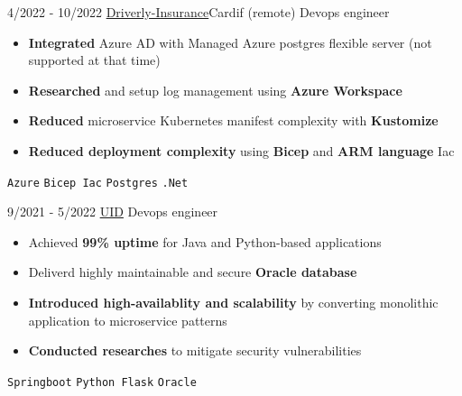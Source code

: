 \documentclass[9pt]{developercv} %
\begin{document}
\begin{center}
    \hdashrule[0.2ex]{\linewidth}{0.5pt}{.8mm}
\end{center}
\vspace{5pt}
\begin{entrylist}
    \entry
    {4/2022 - 10/2022}
    {\href{https://driverly.co.uk}{Driverly-Insurance}\newline\small\textnormal{Cardif (remote)}}
    {Devops engineer}
    {\vspace{-6pt}
    \begin{itemize}[itemsep=2pt,topsep=0pt,parsep=0pt,partopsep=0pt, leftmargin=-1pt]
        \item{\textbf{Integrated} Azure AD with Managed Azure postgres flexible server (not supported at that time)}
        \item{\textbf{Researched} and setup log management using \textbf{Azure Workspace}}
        \item{\textbf{Reduced} microservice Kubernetes manifest complexity with \textbf{Kustomize}}
        \item{\textbf{Reduced deployment complexity} using \textbf{Bicep} and \textbf{ARM language} Iac}
    \end{itemize}
    {\vspace{2pt}}
    \texttt{Azure} \slashsep \texttt{Bicep Iac} \slashsep \texttt{Postgres} \slashsep \texttt{.Net}}
\end{entrylist}
\begin{center}
    \hdashrule[0.2ex]{\linewidth}{0.5pt}{.8mm}
\end{center}
\vspace{5pt}
\begin{entrylist}
    \entry
    {9/2021 - 5/2022}
    {\href{https://u-id.net}{UID}}
    {Devops engineer}
    {\vspace{-6pt}
    \begin{itemize}[itemsep=2pt,topsep=0pt,parsep=0pt,partopsep=0pt, leftmargin=-1pt]
        \item{Achieved \textbf{99\% uptime} for Java and Python-based applications}
        \item{Deliverd highly maintainable and secure \textbf{Oracle database}}
        \item{\textbf{Introduced high-availablity and scalability} by converting monolithic application to microservice patterns}
        \item{\textbf{Conducted researches} to mitigate security vulnerabilities}
    \end{itemize}
    {\vspace{2pt}}
    \texttt{Springboot} \slashsep \texttt{Python Flask} \slashsep \texttt{Oracle}}
\end{entrylist}
\end{document}

